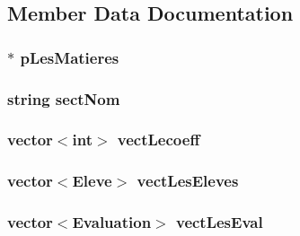 \subsection{Member Data Documentation}
\hypertarget{classSection_a6c2677f4e9338c6fa9fad1c760f5b454}{
\subsubsection[{p\+Les\+Matieres}]{$\ast$ p\+Les\+Matieres\hspace{0.3cm}{\ttfamily [private]}}}\label{classSection_a6c2677f4e9338c6fa9fad1c760f5b454}
\hypertarget{classSection_afc006f0e8bec65604d429072fab5ab67}{
\subsubsection[{sect\+Nom}]{\setlength{\rightskip}{0pt plus 5cm}string sect\+Nom\hspace{0.3cm}{\ttfamily [private]}}}\label{classSection_afc006f0e8bec65604d429072fab5ab67}
\hypertarget{classSection_a71ad777dc4635ae028dc095caad9708e}{
\subsubsection[{vect\+Lecoeff}]{\setlength{\rightskip}{0pt plus 5cm}vector$<$int$>$ vect\+Lecoeff\hspace{0.3cm}{\ttfamily [private]}}}\label{classSection_a71ad777dc4635ae028dc095caad9708e}
\hypertarget{classSection_a859ea90f3e03254b893ccb4b9b5fce10}{
\subsubsection[{vect\+Les\+Eleves}]{\setlength{\rightskip}{0pt plus 5cm}vector$<${\bf Eleve}$>$ vect\+Les\+Eleves\hspace{0.3cm}{\ttfamily [private]}}}\label{classSection_a859ea90f3e03254b893ccb4b9b5fce10}
\hypertarget{classSection_a015d9967c81dfab32f5ccdffebd5b71b}{
\subsubsection[{vect\+Les\+Eval}]{\setlength{\rightskip}{0pt plus 5cm}vector$<${\bf Evaluation}$>$ vect\+Les\+Eval\hspace{0.3cm}{\ttfamily [private]}}}\label{classSection_a015d9967c81dfab32f5ccdffebd5b71b}

